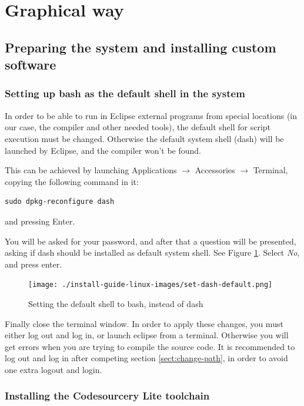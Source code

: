 \documentclass[a4paper, 10pt]{article}
\begin{document}
\section{Graphical way}

\subsection{Preparing the system and installing custom software}


\subsubsection{Setting up bash as the default shell in the system}

In order to be able to run in Eclipse external programs from special locations
(in our case, the compiler and other needed tools),
the default shell for script execution must be changed.
Otherwise the default system shell (dash) will be launched by Eclipse,
and the compiler won't be found.

This can be achieved by launching Applications $\rightarrow$ Accessories $\rightarrow$ Terminal,
copying the following command in it:

\begin{verbatim}
sudo dpkg-reconfigure dash
\end{verbatim}

and pressing Enter.

You will be asked for your password,
and after that a question will be presented, asking
if dash should be installed as default system shell.
See Figure \ref{fig:set-dash-default}.
Select \emph{No}, and press enter.

    \begin{figure}[H]
    \centering
        \texttt{[image: ./install-guide-linux-images/set-dash-default.png]}
        \caption{Setting the default shell to bash, instead of dash}
        \label{fig:set-dash-default}
    \end{figure}

Finally close the terminal window.
In order to apply these changes, you must either log out and log in,
or launch eclipse from a terminal.
Otherwise you will get errors when you are trying to compile the source code.
It is recommended to log out and log in after
competing section \ref{sect:change-path}, in order to avoid one extra logout and login.

\subsubsection{Installing the Codesourcery Lite toolchain}
\end{document}

